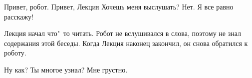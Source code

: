 \begin{dialog}
\X Привет, робот.
\R Привет, Лекция
\X Хочешь меня выслушать?
\R Нет.
\X Я все равно расскажу!
\end{dialog}

\begin{monolog}
Лекция начал что"~то читать. Робот не вслушивался в слова, поэтому не знал содержания этой беседы. Когда Лекция наконец закончил, он снова обратился к роботу.
\end{monolog}

\begin{dialog}
\X Ну как? Ты многое узнал?
\R Мне грустно.
\end{dialog}